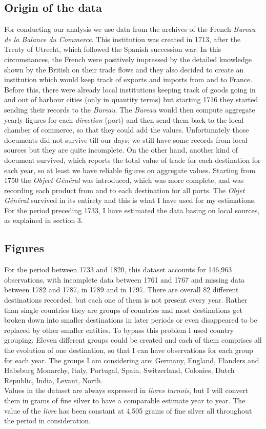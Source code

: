 \documentclass[12pt,a4paper,titlepage,english]{article}
\begin{document}
\subsection{Origin of the data}
For conducting our analysis we use data from the archives of the French \textit{Bureau de la Balance du Commerce}. This institution was created in 1713, after the Treaty of Utrecht, which followed the Spanish succession war. In this circumstances, the French were positively impressed by the detailed knowledge shown by the British on their trade flows and they also decided to create an institution which would keep track of exports and imports from and to France. Before this, there were already local institutions keeping track of goods going in and out of harbour cities (only in quantity terms) but starting 1716 they started sending their records to the \textit{Bureau}. The \textit{Bureau} would then compute aggregate yearly figures for each \textit{direction} (port) and then send them back to the local chamber of commerce, so that they could add the values. Unfortunately those documents did not survive till our days; we still have some records from local sources but they are quite incomplete. On the other hand, another kind of document survived, which reports the total value of trade for each destination for each year, so at least we have reliable figures on aggregate values. Starting from 1750 the \textit{Object Général} was introduced, which was more complete, and was recording each product from and to each destination for all ports. The \textit{Objet Général} survived in its entirety and this is what I have used for my estimations. For the period preceding 1733, I have estimated the data basing on local sources, as explained in section 3. \\
\subsection{Figures}
For the period between 1733 and 1820, this dataset accounts for 146,963 observations, with incomplete data between 1761 and 1767 and missing data between 1782 and 1787, in 1789 and in 1797. There are overall 82 different destinations recorded, but each one of them is not present every year. Rather than single countries they are groups of countries and most destinations get broken down into smaller destinations in later periods or even disappeared to be replaced by other smaller entities. To bypass this problem I used country grouping. Eleven different groups could be created and each of them comprises all the evolution of one destination, so that I can have observations for each group for each year. The groups I am considering are: Germany, England, Flanders and Habsburg Monarchy, Italy, Portugal, Spain, Switzerland, Colonies, Dutch Republic, India, Levant, North. \\
Values in the dataset are always expressed in \textit{livres turnois}, but I will convert them in grams of fine silver to have a comparable estimate year to year. The value of the \textit{livre} has been constant at 4.505 grams of fine silver all throughout the period in consideration.
\end{document}
